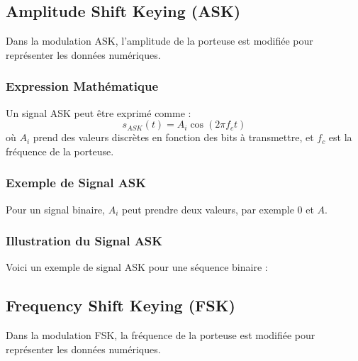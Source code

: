 \documentclass[10pt,a4paper]{article}
\begin{document}
\subsection*{Amplitude Shift Keying (ASK)}
Dans la modulation ASK, l'amplitude de la porteuse est modifiée pour représenter les données numériques.

\subsubsection*{Expression Mathématique}
Un signal ASK peut être exprimé comme :
\[ s_{ASK}(t) = A_i \cos(2\pi f_c t) \]
où \( A_i \) prend des valeurs discrètes en fonction des bits à transmettre, et \( f_c \) est la fréquence de la porteuse.

\subsubsection*{Exemple de Signal ASK}
Pour un signal binaire, \( A_i \) peut prendre deux valeurs, par exemple 0 et \( A \).

\subsubsection*{Illustration du Signal ASK}
Voici un exemple de signal ASK pour une séquence binaire :


\subsection*{Frequency Shift Keying (FSK)}
Dans la modulation FSK, la fréquence de la porteuse est modifiée pour représenter les données numériques.
\end{document}
